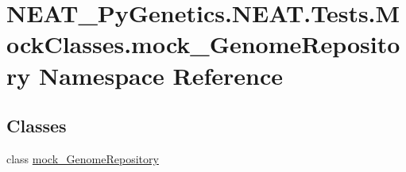 \hypertarget{namespaceNEAT__PyGenetics_1_1NEAT_1_1Tests_1_1MockClasses_1_1mock__GenomeRepository}{}\section{N\+E\+A\+T\+\_\+\+Py\+Genetics.\+N\+E\+A\+T.\+Tests.\+Mock\+Classes.\+mock\+\_\+\+Genome\+Repository Namespace Reference}
\label{namespaceNEAT__PyGenetics_1_1NEAT_1_1Tests_1_1MockClasses_1_1mock__GenomeRepository}
\subsection*{Classes}
\begin{DoxyCompactItemize}
\item 
class \hyperlink{classNEAT__PyGenetics_1_1NEAT_1_1Tests_1_1MockClasses_1_1mock__GenomeRepository_1_1mock__GenomeRepository}{mock\+\_\+\+Genome\+Repository}
\end{DoxyCompactItemize}
